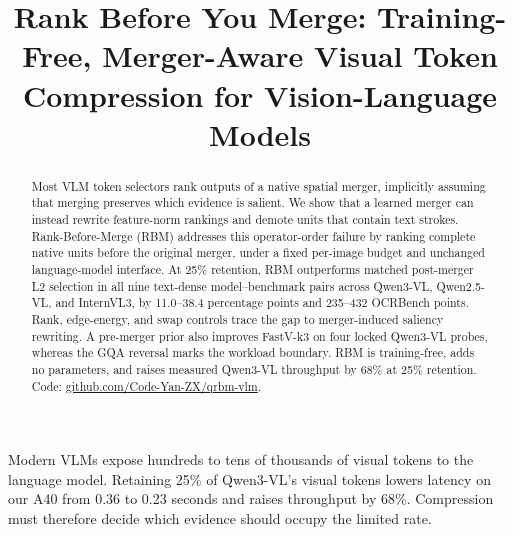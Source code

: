 \documentclass[smallabstract,smallcaptions]{dccpaper}
\begin{document}

\title{\large\textbf{Rank Before You Merge: Training-Free, Merger-Aware
Visual Token Compression for Vision-Language Models}}

\author{}

\maketitle
\thispagestyle{empty}
\vspace{0.5em}

\begin{abstract}
Most VLM token selectors rank outputs of a native spatial merger, implicitly
assuming that merging preserves which evidence is salient. We show that a
learned merger can instead rewrite feature-norm rankings and demote units that
contain text strokes. Rank-Before-Merge (RBM) addresses this operator-order
failure by ranking complete native units before the original merger, under a
fixed per-image budget and unchanged language-model interface. At 25\%
retention, RBM outperforms matched post-merger L2 selection in all nine
text-dense model--benchmark pairs across Qwen3-VL, Qwen2.5-VL, and InternVL3,
by 11.0--38.4 percentage points and 235--432 OCRBench points. Rank, edge-energy,
and swap controls trace the gap to merger-induced saliency rewriting. A
pre-merger prior also improves FastV-k3 on four locked Qwen3-VL probes, whereas
the GQA reversal marks the workload boundary. RBM is training-free, adds no
parameters, and raises measured Qwen3-VL throughput by 68\% at 25\% retention.
Code:
\href{https://github.com/Code-Yan-ZX/qrbm-vlm}{github.com/Code-Yan-ZX/qrbm-vlm}.
\end{abstract}


Modern VLMs expose hundreds to tens of thousands of visual tokens to the
language model. Retaining 25\% of Qwen3-VL's visual tokens lowers latency on our
A40 from 0.36 to 0.23 seconds and raises throughput by 68\%. Compression must
therefore decide which evidence should occupy the limited rate.
\end{document}
